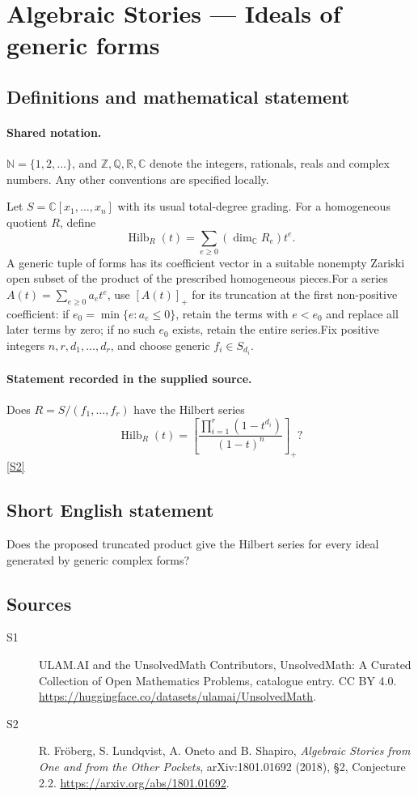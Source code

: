 \documentclass[11pt]{article}
\newcommand{\sref}[2]{\hyperlink{source:#1:#2}{[S#2]}}
\begin{document}
\section{Algebraic Stories — Ideals of generic forms}\label{statement}

\subsection{Definitions and mathematical statement}

\paragraph{Shared notation.}$\mathbb N=\{1,2,\ldots\}$, and $\mathbb Z,\mathbb Q,\mathbb R,\mathbb C$ denote the integers, rationals, reals and complex numbers. Any other conventions are specified locally.


Let $S=\mathbb C[x_1,\ldots,x_n]$ with its usual total-degree grading. For a homogeneous quotient $R$, define
\[\operatorname{Hilb}_R(t)=\sum_{e\geq0}(\dim_{\mathbb C}R_e)t^e.
\]
A generic tuple of forms has its coefficient vector in a suitable nonempty Zariski open subset of the product of the prescribed homogeneous pieces.For a series $A(t)=\sum_{e\geq0}a_et^e$, use $[A(t)]_+$ for its truncation at the first non-positive coefficient: if $e_0=\min\{e:a_e\leq0\}$, retain the terms with $e<e_0$ and replace all later terms by zero; if no such $e_0$ exists, retain the entire series.Fix positive integers $n,r,d_1,\ldots,d_r$, and choose generic $f_i\in S_{d_i}$.
\paragraph{Statement recorded in the supplied source.}
Does $R=S/(f_1,\ldots,f_r)$ have the Hilbert series
\[\operatorname{Hilb}_R(t)=\left[\frac{\prod_{i=1}^r(1-t^{d_i})}{(1-t)^n}\right]_+?\] \sref{statement}{2}
\subsection{Short English statement}
Does the proposed truncated product give the Hilbert series for every ideal generated by generic complex forms?
\subsection{Sources}
\begin{description}
\item[\hypertarget{source:statement:1}{S1}] ULAM.AI and the UnsolvedMath Contributors, UnsolvedMath: A Curated Collection of Open Mathematics Problems, catalogue entry. CC BY 4.0. \url{https://huggingface.co/datasets/ulamai/UnsolvedMath}.
\item[\hypertarget{source:statement:2}{S2}] R. Fröberg, S. Lundqvist, A. Oneto and B. Shapiro, \emph{Algebraic Stories from One and from the Other Pockets}, arXiv:1801.01692 (2018), §2, Conjecture 2.2. \url{https://arxiv.org/abs/1801.01692}.
\end{description}
\label{end:statement}
\end{document}

